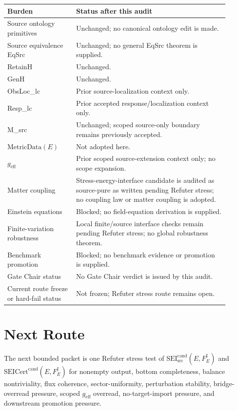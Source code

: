\documentclass[11pt]{article}
\newcommand{\MetricData}{\mathrm{MetricData}}
\newcommand{\geff}{g_{\mathrm{eff}}}
\newcommand{\SEICand}{\mathrm{SEI}_{\mathrm{src}}^{\mathrm{cand}}}
\newcommand{\SEICertCand}{\mathrm{SEICert}^{\mathrm{cand}}}
\begin{document}
\begin{longtable}{p{0.28\linewidth}p{0.62\linewidth}}
\toprule
Burden & Status after this audit \\
\midrule
Source ontology primitives & Unchanged; no canonical ontology edit is made. \\
Source equivalence EqSrc & Unchanged; no general EqSrc theorem is supplied. \\
RetainH & Unchanged. \\
GenH & Unchanged. \\
ObsLoc\_lc & Prior source-localization context only. \\
Resp\_lc & Prior accepted response/localization context only. \\
M\_src & Unchanged; scoped source-only boundary remains previously accepted. \\
\(\MetricData(E)\) & Not adopted here. \\
\(\geff\) & Prior scoped source-extension context only; no scope expansion. \\
Matter coupling & Stress-energy-interface candidate is audited as source-pure as written pending Refuter stress; no coupling law or matter coupling is adopted. \\
Einstein equations & Blocked; no field-equation derivation is supplied. \\
Finite-variation robustness & Local finite/source interface checks remain pending Refuter stress; no global robustness theorem. \\
Benchmark promotion & Blocked; no benchmark evidence or promotion is supplied. \\
Gate Chair status & No Gate Chair verdict is issued by this audit. \\
Current route freeze or hard-fail status & Not frozen; Refuter stress route remains open. \\
\bottomrule
\end{longtable}

\section{Next Route}

The next bounded packet is one Refuter stress test of
\(\SEICand(E,F_E^\sharp)\) and \(\SEICertCand(E,F_E^\sharp)\) for nonempty
output, bottom completeness, balance nontriviality, flux coherence,
sector-uniformity, perturbation stability, bridge-overread pressure, scoped
\(\geff\) overread, no-target-import pressure, and downstream promotion
pressure.
\end{document}
